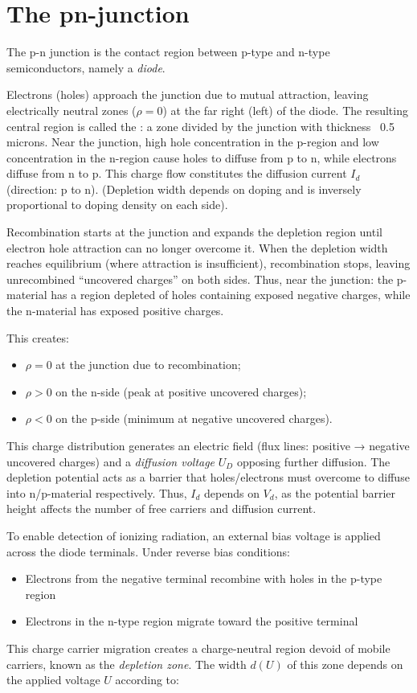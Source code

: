 \section{The pn-junction}
The p-n junction is the contact region between p-type and n-type semiconductors, namely a \emph{diode}.  

Electrons (holes) approach the junction due to mutual attraction, leaving electrically neutral zones ($\rho=0$) at the far right (left) of the diode. The resulting central region is called the : a zone divided by the junction with thickness ~0.5 microns. Near the junction, high hole concentration in the p-region and low concentration in the n-region cause holes to diffuse from p to n, while electrons diffuse from n to p. This charge flow constitutes the diffusion current $I_{d}$ (direction: p to n). (Depletion width depends on doping and is inversely proportional to doping density on each side).  

Recombination starts at the junction and expands the depletion region until electron hole attraction can no longer overcome it. When the depletion width reaches equilibrium (where attraction is insufficient), recombination stops, leaving unrecombined \enquote{uncovered charges} on both sides.  
Thus, near the junction: the p-material has a region depleted of holes containing exposed negative charges, while the n-material has exposed positive charges.  

This creates:
\begin{itemize}
	\item $\rho=0$ at the junction due to recombination;
	\item $\rho>0$ on the n-side (peak at positive uncovered charges);
        \item $\rho<0$ on the p-side (minimum at negative uncovered charges). 
\end{itemize}  

This charge distribution generates an electric field (flux lines: positive → negative uncovered charges) and a \emph{diffusion voltage} $U_{D}$ opposing further diffusion. The depletion potential acts as a barrier that holes/electrons must overcome to diffuse into n/p-material respectively. Thus, $I_{d}$ depends on $V_{d}$, as the potential barrier height affects the number of free carriers and diffusion current.

To enable detection of ionizing radiation, an external bias voltage is applied across the diode terminals. Under reverse bias conditions:
\begin{itemize}
    \item Electrons from the negative terminal recombine with holes in the p-type region
    \item Electrons in the n-type region migrate toward the positive terminal
\end{itemize}
This charge carrier migration creates a charge-neutral region devoid of mobile carriers, known as the \textit{depletion zone}. The width $d(U)$ of this zone depends on the applied voltage $U$ according to:

